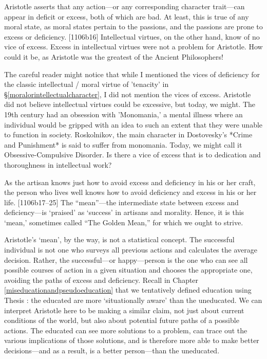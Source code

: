 Aristotle asserts that any action---or any corresponding character trait---can appear in deficit or excess, both of which are bad. At least, this is true of any moral state, as moral states pertain to the passions, and the passions are prone to excess or deficiency. [1106b16] Intellectual virtues, on the other hand, know of no vice of excess. Excess in intellectual virtues were not a problem for Aristotle. How could it be, as Aristotle was the greatest of the Ancient Philosophers!\begin{question}The careful reader might notice that while I mentioned the vices of deficiency for the classic intellectual / moral virtue of 'tenacity' in \S\ref{moralorintellectualcharacter}, I did not mention the vices of excess.  Aristotle did not believe intellectual virtues could be excessive, but today, we might. The 19th century had an obsession with 'Monomania,' a mental illness where an individual would be gripped with an idea to such an extent that they were unable to function in society. Roskolnikov, the main character in Dostovesky's *Crime and Punishment* is said to suffer from monomania.  Today, we might call it Obsessive-Compulsive Disorder.  Is there a vice of excess that is to dedication and thoroughness in intellectual work?\end{question} 

As the artisan knows just how to avoid excess and deficiency in his or her craft, the person who lives well knows how to avoid deficiency and excess in his or her life. [1106b17--25] The ``mean''---the intermediate state between excess and deficiency---is `praised' as `success' in artisans and morality. Hence, it is this `mean,' sometimes called ``The Golden Mean,'' for which we ought to strive.

Aristotle's `mean', by the way, is not a statistical concept. The successful individual is not one who surveys all previous actions and calculates the average decision. Rather, the successful---or happy---person is the one who can see all possible courses of action in a given situation and chooses the appropriate one, avoiding the paths of excess and deficiency. Recall in Chapter \ref{miseducationandpseudoeducation} that we tentatively defined education using Thesis : the educated are more `situationally aware' than the uneducated. We can interpret Aristotle here to be making a similar claim, not just about current conditions of the world, but also about potential future paths of a possible actions. The educated can see more solutions to a problem, can trace out the various implications of those solutions, and is therefore more able to make better decisions---and as a result, is a better person---than the uneducated.

